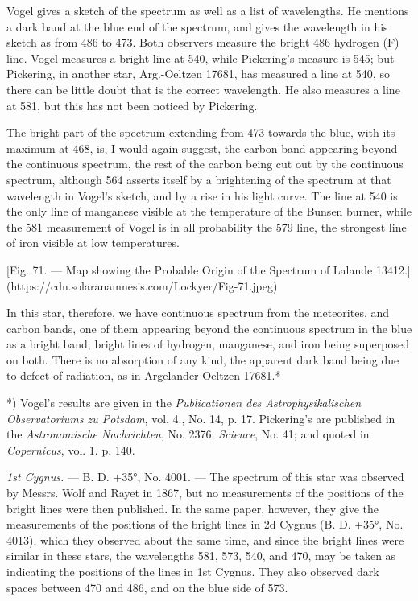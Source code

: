 \documentclass[a4paper, 12pt, oneside, polutonikogreek, english]{article}
\begin{document}
Vogel gives a sketch of the spectrum as well as a list of wavelengths. He mentions a dark band at the blue end of the spectrum, and gives the wavelength in his sketch as from 486 to 473. Both observers measure the bright 486 hydrogen (F) line. Vogel measures a bright line at 540, while Pickering's measure is 545; but Pickering, in another star, Arg.-Oeltzen 17681, has measured a line at 540, so there can be little doubt that is the correct wavelength. He also measures a line at 581, but this has not been noticed by Pickering.

The bright part of the spectrum extending from 473 towards the blue, with its maximum at 468, is, I would again suggest, the carbon band appearing beyond the continuous spectrum, the rest of the carbon being cut out by the continuous spectrum, although 564 asserts itself by a brightening of the spectrum at that wavelength in Vogel's sketch, and by a rise in his light curve. The line at 540 is the only line of manganese visible at the temperature of the Bunsen burner, while the 581 measurement of Vogel is in all probability the 579 line, the strongest line of iron visible at low temperatures.

[Fig. 71. --- Map showing the Probable Origin of the Spectrum of Lalande 13412.](https://cdn.solaranamnesis.com/Lockyer/Fig-71.jpeg)

In this star, therefore, we have continuous spectrum from the meteorites, and carbon bands, one of them appearing beyond the continuous spectrum in the blue as a bright band; bright lines of hydrogen, manganese, and iron being superposed on both. There is no absorption of any kind, the apparent dark band being due to defect of radiation, as in Argelander-Oeltzen 17681.*

*) Vogel's results are given in the \emph{Publicationen des Astrophysikalischen Observatoriums zu Potsdam}, vol. 4., No. 14, p. 17. Pickering's are published in the \emph{Astronomische Nachrichten}, No. 2376; \emph{Science}, No. 41; and quoted in \emph{Copernicus}, vol. 1. p. 140.

\emph{1st Cygnus.} --- B. D. +35°, No. 4001. --- The spectrum of this star was observed by Messrs. Wolf and Rayet in 1867, but no measurements of the positions of the bright lines were then published. In the same paper, however, they give the measurements of the positions of the bright lines in 2d Cygnus (B. D. +35°, No. 4013), which they observed about the same time, and since the bright lines were similar in these stars, the wavelengths 581, 573, 540, and 470, may be taken as indicating the positions of the lines in 1st Cygnus. They also observed dark spaces between 470 and 486, and on the blue side of 573.
\end{document}

